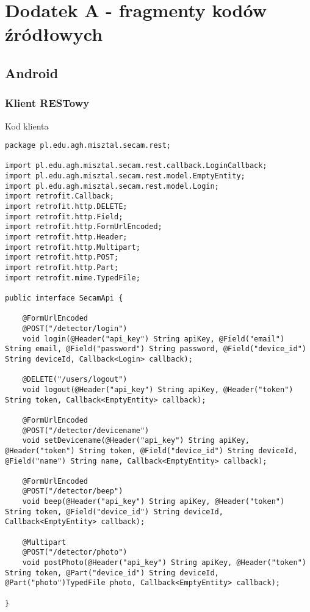 \chapter{Dodatek A - fragmenty kodów źródłowych}
\label{cha:dodatekA}

\section{Android}
\label{sec:android}


\subsection{Klient RESTowy}
\label{sec:androidApi}

Kod klienta 

\begin{lstlisting}
package pl.edu.agh.misztal.secam.rest;

import pl.edu.agh.misztal.secam.rest.callback.LoginCallback;
import pl.edu.agh.misztal.secam.rest.model.EmptyEntity;
import pl.edu.agh.misztal.secam.rest.model.Login;
import retrofit.Callback;
import retrofit.http.DELETE;
import retrofit.http.Field;
import retrofit.http.FormUrlEncoded;
import retrofit.http.Header;
import retrofit.http.Multipart;
import retrofit.http.POST;
import retrofit.http.Part;
import retrofit.mime.TypedFile;

public interface SecamApi {

    @FormUrlEncoded
    @POST("/detector/login")
    void login(@Header("api_key") String apiKey, @Field("email") String email, @Field("password") String password, @Field("device_id") String deviceId, Callback<Login> callback);

    @DELETE("/users/logout")
    void logout(@Header("api_key") String apiKey, @Header("token") String token, Callback<EmptyEntity> callback);

    @FormUrlEncoded
    @POST("/detector/devicename")
    void setDevicename(@Header("api_key") String apiKey, @Header("token") String token, @Field("device_id") String deviceId, @Field("name") String name, Callback<EmptyEntity> callback);

    @FormUrlEncoded
    @POST("/detector/beep")
    void beep(@Header("api_key") String apiKey, @Header("token") String token, @Field("device_id") String deviceId, Callback<EmptyEntity> callback);

    @Multipart
    @POST("/detector/photo")
    void postPhoto(@Header("api_key") String apiKey, @Header("token") String token, @Part("device_id") String deviceId, @Part("photo")TypedFile photo, Callback<EmptyEntity> callback);

}
\end{lstlisting}

